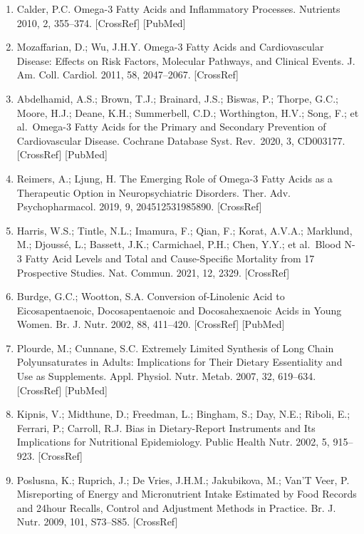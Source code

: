 \documentclass[journal=jacsat,manuscript=article]{achemso}
\providecommand{\tightlist}{%
  \setlength{\itemsep}{0pt}\setlength{\parskip}{0pt}}
\begin{document}
\begin{enumerate}
\def\labelenumi{\arabic{enumi}.}
\tightlist
\item
  Calder, P.C. Omega-3 Fatty Acids and Inflammatory Processes. Nutrients
  2010, 2, 355--374. {[}CrossRef{]} {[}PubMed{]}
\item
  Mozaffarian, D.; Wu, J.H.Y. Omega-3 Fatty Acids and Cardiovascular
  Disease: Effects on Risk Factors, Molecular Pathways, and Clinical
  Events. J. Am. Coll. Cardiol. 2011, 58, 2047--2067. {[}CrossRef{]}
\item
  Abdelhamid, A.S.; Brown, T.J.; Brainard, J.S.; Biswas, P.; Thorpe,
  G.C.; Moore, H.J.; Deane, K.H.; Summerbell, C.D.; Worthington, H.V.;
  Song, F.; et al.~Omega-3 Fatty Acids for the Primary and Secondary
  Prevention of Cardiovascular Disease. Cochrane Database Syst.
  Rev.~2020, 3, CD003177. {[}CrossRef{]} {[}PubMed{]}
\item
  Reimers, A.; Ljung, H. The Emerging Role of Omega-3 Fatty Acids as a
  Therapeutic Option in Neuropsychiatric Disorders. Ther. Adv.
  Psychopharmacol. 2019, 9, 204512531985890. {[}CrossRef{]}
\item
  Harris, W.S.; Tintle, N.L.; Imamura, F.; Qian, F.; Korat, A.V.A.;
  Marklund, M.; Djoussé, L.; Bassett, J.K.; Carmichael, P.H.; Chen,
  Y.Y.; et al.~Blood N-3 Fatty Acid Levels and Total and Cause-Specific
  Mortality from 17 Prospective Studies. Nat. Commun. 2021, 12, 2329.
  {[}CrossRef{]}
\item
  Burdge, G.C.; Wootton, S.A. Conversion of-Linolenic Acid to
  Eicosapentaenoic, Docosapentaenoic and Docosahexaenoic Acids in Young
  Women. Br. J. Nutr. 2002, 88, 411--420. {[}CrossRef{]} {[}PubMed{]}
\item
  Plourde, M.; Cunnane, S.C. Extremely Limited Synthesis of Long Chain
  Polyunsaturates in Adults: Implications for Their Dietary Essentiality
  and Use as Supplements. Appl. Physiol. Nutr. Metab. 2007, 32,
  619--634. {[}CrossRef{]} {[}PubMed{]}
\item
  Kipnis, V.; Midthune, D.; Freedman, L.; Bingham, S.; Day, N.E.;
  Riboli, E.; Ferrari, P.; Carroll, R.J. Bias in Dietary-Report
  Instruments and Its Implications for Nutritional Epidemiology. Public
  Health Nutr. 2002, 5, 915--923. {[}CrossRef{]}
\item
  Poslusna, K.; Ruprich, J.; De Vries, J.H.M.; Jakubikova, M.; Van'T
  Veer, P. Misreporting of Energy and Micronutrient Intake Estimated by
  Food Records and 24hour Recalls, Control and Adjustment Methods in
  Practice. Br. J. Nutr. 2009, 101, S73--S85. {[}CrossRef{]}

\end{enumerate}
\end{document}
